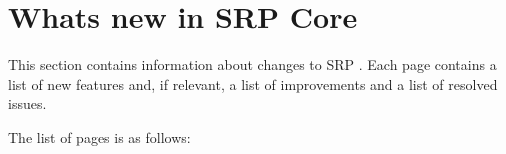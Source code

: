 \chapter{What\textquotesingle{}s new in SRP Core}
\hypertarget{md__hey_tea_9_2_library_2_package_cache_2com_8unity_8render-pipelines_8core_0d14_80_88_2_documentation_0i_2whats-new}{}\label{md__hey_tea_9_2_library_2_package_cache_2com_8unity_8render-pipelines_8core_0d14_80_88_2_documentation_0i_2whats-new}
\label{md__hey_tea_9_2_library_2_package_cache_2com_8unity_8render-pipelines_8core_0d14_80_88_2_documentation_0i_2whats-new_autotoc_md1866}%
%
 This section contains information about changes to SRP . Each page contains a list of new features and, if relevant, a list of improvements and a list of resolved issues.

The list of pages is as follows\+:


\begin{DoxyItemize}
\item {}
\item {} 
\end{DoxyItemize}